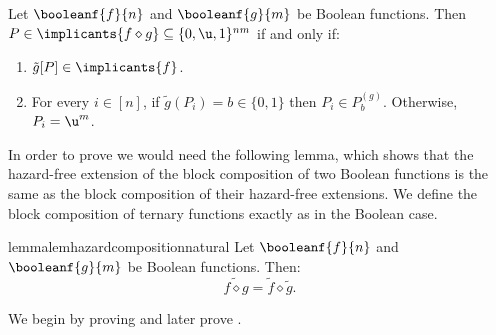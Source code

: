 \documentclass[acmsmall, nonacm, authorversion]{acmart}
\begin{document}
\begin{proposition}\label{prop:prime-implicants-composition}
Let $\booleanf{f}{n}$ and $\booleanf{g}{m}$ be Boolean functions. Then $P\in \implicants{f\diamond g} \subseteq \{0,\u,1\}^{nm}$ if and only if:
\begin{enumerate}
    \item $\tilde{g}[P] \in \implicants{f}$. \label{item:prime-implicants-composition-1}
    \item For every $i\in[n]$, if $\tilde{g}(P_i)=b\in\{0,1\}$ then $P_i\in P_{b}^{(g)}$. Otherwise, $P_i=\u^m$. \label{item:prime-implicants-composition-2}
\end{enumerate}
\end{proposition}
In order to prove  we would need the following lemma, which shows that the hazard-free extension of the block composition of two Boolean functions is the same as the block composition of their hazard-free extensions. We define the block composition of ternary functions exactly as in the Boolean case.
\begin{restatable}{lemma}{lemhazardcompositionnatural}\label{lem:hazard-free-extension-composition}
Let $\booleanf{f}{n}$ and $\booleanf{g}{m}$ be Boolean functions. Then:
\[
\widetilde{f\diamond g} = \tilde{f} \diamond \tilde{g}.
\]
\end{restatable}
We begin by proving  and later prove .
\end{document}
